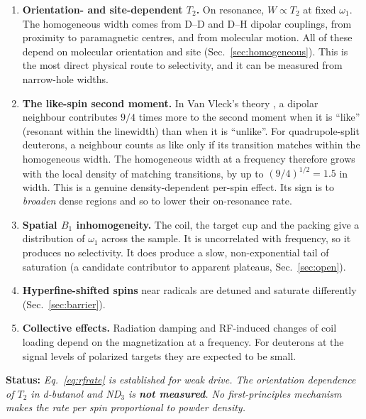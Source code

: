 \documentclass[11pt]{article}
\newcommand{\status}[1]{\par\noindent\textbf{\textsf{Status:}} \emph{#1}\par}
\begin{document}
\begin{enumerate}
\item \textbf{Orientation- and site-dependent $T_2$.} On resonance, $W\propto T_2$ at fixed
$\omega_1$. The homogeneous width comes from D--D and D--H dipolar couplings, from proximity
to paramagnetic centres, and from molecular motion. All of these depend on molecular
orientation and site (Sec.~\ref{sec:homogeneous}). This is the most direct physical route to
selectivity, and it can be measured from narrow-hole widths.

\item \textbf{The like-spin second moment.} In Van Vleck's theory \cite{VanVleck1948,Abragam1961},
a dipolar neighbour contributes $9/4$ times more to the second moment when it is ``like''
(resonant within the linewidth) than when it is ``unlike''. For quadrupole-split deuterons,
a neighbour counts as like only if its transition matches within the homogeneous width. The
homogeneous width at a frequency therefore grows with the local density of matching
transitions, by up to $(9/4)^{1/2}=1.5$ in width. This is a genuine density-dependent
per-spin effect. Its sign is to \emph{broaden} dense regions and so to lower their
on-resonance rate.

\item \textbf{Spatial $B_1$ inhomogeneity.} The coil, the target cup and the packing give a
distribution of $\omega_1$ across the sample. It is uncorrelated with frequency, so it
produces no selectivity. It does produce a slow, non-exponential tail of saturation (a
candidate contributor to apparent plateaus, Sec.~\ref{sec:open}).

\item \textbf{Hyperfine-shifted spins} near radicals are detuned and saturate differently
(Sec.~\ref{sec:barrier}).

\item \textbf{Collective effects.} Radiation damping and RF-induced changes of coil loading
depend on the magnetization at a frequency. For deuterons at the signal levels of polarized
targets they are expected to be small.
\end{enumerate}

\status{Eq.~\eqref{eq:rfrate} is established for weak drive. The orientation dependence of
$T_2$ in d-butanol and ND$_3$ is \textbf{not measured}. No first-principles mechanism makes the
rate per spin proportional to powder density.}
\end{document}
